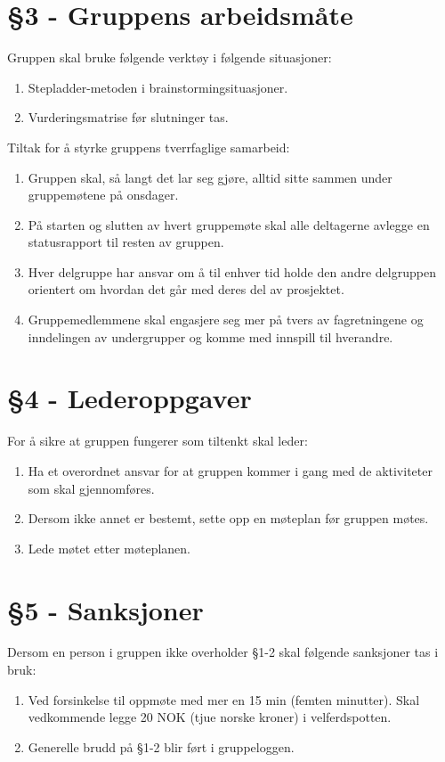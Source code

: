 \section*{§3 - Gruppens arbeidsmåte}
Gruppen skal bruke følgende verktøy i følgende situasjoner:
\begin{enumerate}
\item Stepladder-metoden i brainstormingsituasjoner.
\item Vurderingsmatrise før slutninger tas.
\end{enumerate}
Tiltak for å styrke gruppens tverrfaglige samarbeid:
\begin{enumerate}
\item Gruppen skal, så langt det lar seg gjøre, alltid sitte sammen under gruppemøtene på onsdager.
\item På starten og slutten av hvert gruppemøte skal alle deltagerne avlegge en statusrapport til resten av gruppen.
\item Hver delgruppe har ansvar om å til enhver tid holde den andre delgruppen orientert om hvordan det går med deres del av prosjektet. 
\item Gruppemedlemmene skal engasjere seg mer på tvers av fagretningene og inndelingen av undergrupper og komme med innspill til hverandre. 
\end{enumerate}
\section*{§4 - Lederoppgaver}
For å sikre at gruppen fungerer som tiltenkt skal leder:
\begin{enumerate}
\item Ha et overordnet ansvar for at gruppen kommer i gang med de aktiviteter som skal gjennomføres.
\item Dersom ikke annet er bestemt, sette opp en møteplan før gruppen møtes.
\item Lede møtet etter møteplanen.
\end{enumerate}
\section*{§5 - Sanksjoner}
Dersom en person i gruppen ikke overholder §1-2 skal følgende sanksjoner tas i bruk:
\begin{enumerate}
\item Ved forsinkelse til oppmøte med mer en 15 min (femten minutter). Skal vedkommende legge 20 NOK (tjue norske kroner) i velferdspotten. 
\item Generelle brudd på §1-2 blir ført i gruppeloggen. 
\end{enumerate}
